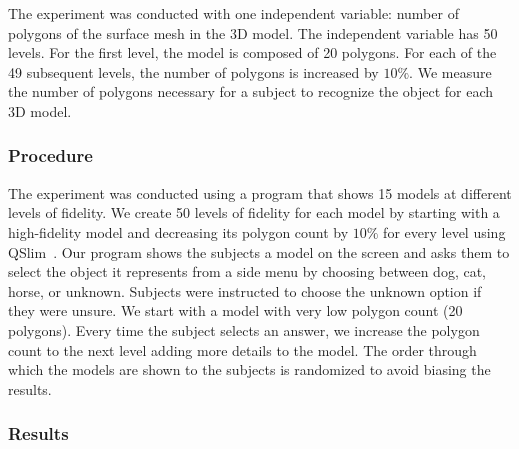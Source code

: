 The experiment was conducted with one independent variable: number of polygons of the surface mesh in the 3D model.
The independent variable has 50 levels. For the first level, the model is composed of 20 polygons. For each of the 49 subsequent levels, the number of polygons is increased by $10\%$. We measure the number of polygons necessary for a subject to recognize the object for each 3D model.

\subsubsection{Procedure}

The experiment was conducted using a program that shows 15 models at different levels of fidelity.  We create 50 levels of fidelity for each model by starting with a high-fidelity model and decreasing its polygon count by $10\%$ for every level using QSlim~\cite{garland1997}. Our program shows the subjects a model on the screen and asks them to select the object it represents from a side menu by choosing between dog, cat, horse, or unknown. Subjects were instructed to choose the unknown option if they were unsure. We start with a model with very low polygon count (20 polygons). Every time the subject selects an answer, we increase the polygon count to the next level adding more details to the model. The order through which the models are shown to the subjects is randomized to avoid biasing the results. 

\subsubsection{Results}

